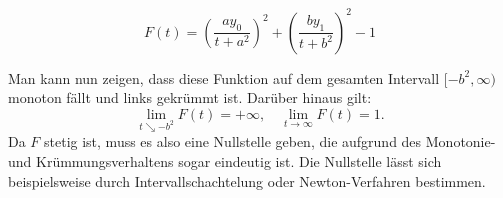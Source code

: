 \begin{enumerate}
	\begin{equation}
		F(t) = \left(\frac{ay_0}{t+a^2}\right)^2 + \left(\frac{by_1}{t+b^2}\right)^2 - 1
	\end{equation}
	
	Man kann nun zeigen, dass diese Funktion auf dem gesamten Intervall $[-b^2,\infty)$ monoton fällt und links gekrümmt ist. Darüber hinaus gilt:
	\[
	\lim\limits_{t \searrow -b^2}{F(t)}	= +\infty, \quad\lim\limits_{t \rightarrow \infty}{F(t)}	= 1.
	\]
	Da $F$ stetig ist, muss es also eine Nullstelle geben, die aufgrund des Monotonie- und Krümmungsverhaltens sogar eindeutig ist. Die Nullstelle lässt sich beispielsweise durch Intervallschachtelung oder Newton-Verfahren bestimmen. 
\end{enumerate}









